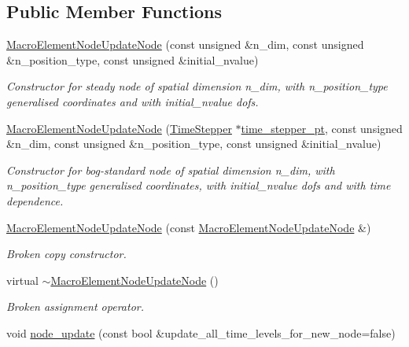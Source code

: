 \subsection*{Public Member Functions}
\begin{DoxyCompactItemize}
\item 
\hyperlink{classoomph_1_1MacroElementNodeUpdateNode_a3a5f0c384b32c6ba31bc6ed06c142384}{Macro\+Element\+Node\+Update\+Node} (const unsigned \&n\+\_\+dim, const unsigned \&n\+\_\+position\+\_\+type, const unsigned \&initial\+\_\+nvalue)
\begin{DoxyCompactList}\small\item\em Constructor for steady node of spatial dimension n\+\_\+dim, with n\+\_\+position\+\_\+type generalised coordinates and with initial\+\_\+nvalue dofs. \end{DoxyCompactList}\item 
\hyperlink{classoomph_1_1MacroElementNodeUpdateNode_a4088c7ab89b11b5e60900082e076ffc9}{Macro\+Element\+Node\+Update\+Node} (\hyperlink{classoomph_1_1TimeStepper}{Time\+Stepper} $\ast$\hyperlink{classoomph_1_1Data_a5b34970d16205921dca3ada720da8445}{time\+\_\+stepper\+\_\+pt}, const unsigned \&n\+\_\+dim, const unsigned \&n\+\_\+position\+\_\+type, const unsigned \&initial\+\_\+nvalue)
\begin{DoxyCompactList}\small\item\em Constructor for bog-\/standard node of spatial dimension n\+\_\+dim, with n\+\_\+position\+\_\+type generalised coordinates, with initial\+\_\+nvalue dofs and with time dependence. \end{DoxyCompactList}\item 
\hyperlink{classoomph_1_1MacroElementNodeUpdateNode_a64920d828fece6b437f6b790d60f6b85}{Macro\+Element\+Node\+Update\+Node} (const \hyperlink{classoomph_1_1MacroElementNodeUpdateNode}{Macro\+Element\+Node\+Update\+Node} \&)
\begin{DoxyCompactList}\small\item\em Broken copy constructor. \end{DoxyCompactList}\item 
virtual \hyperlink{classoomph_1_1MacroElementNodeUpdateNode_a1c249d92c5e310a7d5921c45d4775787}{$\sim$\+Macro\+Element\+Node\+Update\+Node} ()
\begin{DoxyCompactList}\small\item\em Broken assignment operator. \end{DoxyCompactList}\item 
void \hyperlink{classoomph_1_1MacroElementNodeUpdateNode_a02adaf04277672fd0e1be5296e6ed6cf}{node\+\_\+update} (const bool \&update\+\_\+all\+\_\+time\+\_\+levels\+\_\+for\+\_\+new\+\_\+node=false)

\end{DoxyCompactItemize}
